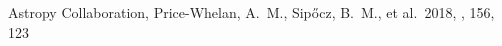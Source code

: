 \documentclass[twocolumn, twocolappendix]{aastex63}
\begin{document}
\begin{itemize}
\begin{thebibliography}{}








 Astropy Collaboration, Price-Whelan, A.~M., Sip{\H{o}}cz, B.~M., et al.\ 2018, \aj, 156, 123


























\end{thebibliography}
\end{itemize}
\end{document}

